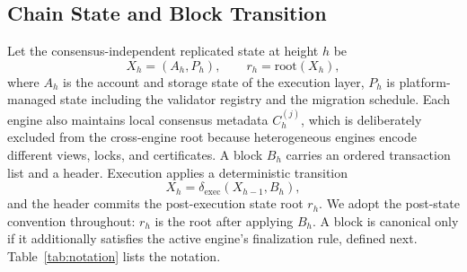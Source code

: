 \documentclass[journal]{IEEEtran}
\theoremstyle{definition}
\theoremstyle{remark}
\begin{document}
\subsection{Chain State and Block Transition}
Let the consensus-independent replicated state at height $h$ be
\begin{equation}
X_h = (A_h, P_h), \qquad r_h=\mathrm{root}(X_h),
\end{equation}
where $A_h$ is the account and storage state of the execution layer, $P_h$ is
platform-managed state including the validator registry and the migration schedule. Each engine
also maintains local consensus metadata $C_h^{(j)}$, which is deliberately excluded from the
cross-engine root because heterogeneous engines encode different views, locks, and certificates.
A block $B_h$ carries an ordered transaction list and a header. Execution applies a deterministic transition
\begin{equation}
X_{h} = \delta_{\mathrm{exec}}(X_{h-1}, B_h),
\end{equation}
and the header commits the post-execution state root $r_h$. We adopt the
post-state convention throughout: $r_h$ is the root after applying $B_h$. A block is
canonical only if it additionally satisfies the active engine's finalization rule, defined
next. Table~\ref{tab:notation} lists the notation.
\end{document}
